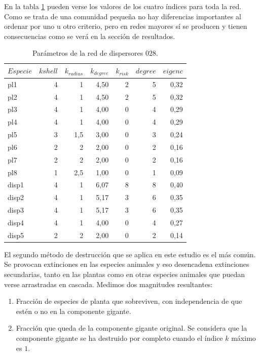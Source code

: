 En la tabla \ref{tab:pars_SD_028} pueden verse los valores de los cuatro índices para toda la red. Como se trata de una comunidad pequeña no hay diferencias importantes
al ordenar por uno u otro criterio, pero en redes mayores sí se producen y tienen consecuencias como se verá en la sección de resultados.



\begin{table}[htbp]
  \centering
  \normalsize
    \begin{tabular}{lrrrrrr}
    \toprule
    $Especie$ & $k shell$ & ${k}_{radius}$ & ${k}_{degree}$ & ${k}_{risk}$ & $degree$ & $eigenc$ \\
\midrule
    pl1  & 4    & 1    & 4,50 & 2    & 5    & 0,32 \\
    pl2  & 4    & 1    & 4,50 & 2    & 5    & 0,32 \\
    pl3  & 4    & 1    & 4,00 & 0    & 4    & 0,29 \\
    pl4  & 4    & 1    & 4,00 & 0    & 4    & 0,29 \\
    pl5  & 3    & 1,5  & 3,00 & 0    & 3    & 0,24 \\
    pl6  & 2    & 2    & 2,00 & 0    & 2    & 0,16 \\
    pl7  & 2    & 2    & 2,00 & 0    & 2    & 0,16 \\
    pl8  & 1    & 2,5  & 1,00 & 0    & 1    & 0,09 \\
    disp1 & 4    & 1    & 6,07 & 8    & 8    & 0,40 \\
    disp2 & 4    & 1    & 5,17 & 3    & 6    & 0,35 \\
    disp3 & 4    & 1    & 5,17 & 3    & 6    & 0,35 \\
    disp4 & 4    & 1    & 4,00 & 0    & 4    & 0,27 \\
    disp5 & 2    & 2    & 2,00 & 0    & 2    & 0,14 \\
    \bottomrule
    \end{tabular}%
    \caption{Parámetros de la red de dispersores $028$.}
  \label{tab:pars_SD_028}%
\end{table}%

El segundo método de destrucción que se aplica en este estudio es el más común. Se provocan extinciones en las especies animales y eso desencadena extinciones secundarias, tanto
en las plantas como en otras especies animales que puedan verse arrastradas en cascada. Medimos dos magnitudes resultantes:

\begin{enumerate}
\item Fracción de especies de planta que sobreviven, con independencia de que estén o no en la componente gigante.
\item Fracción que queda de la componente gigante original. Se considera que la componente gigante se ha destruido por completo cuando el índice $k$ máximo es $1$.
\end{enumerate}

